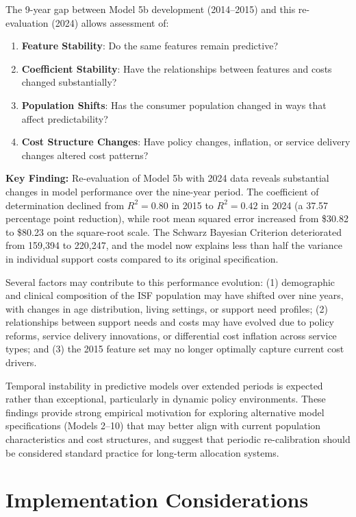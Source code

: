 The 9-year gap between Model 5b development (2014--2015) and this re-evaluation (2024) allows assessment of:

\begin{enumerate}
    \item \textbf{Feature Stability}: Do the same features remain predictive?
    \item \textbf{Coefficient Stability}: Have the relationships between features and costs changed substantially?
    \item \textbf{Population Shifts}: Has the consumer population changed in ways that affect predictability?
    \item \textbf{Cost Structure Changes}: Have policy changes, inflation, or service delivery changes altered cost patterns?
\end{enumerate}

\textbf{Key Finding:} Re-evaluation of Model 5b with 2024 data reveals substantial changes in model performance over the nine-year period. The coefficient of determination declined from $R^2 = 0.80$ in 2015 to $R^2 = 0.42$ in 2024 (a 37.57 percentage point reduction), while root mean squared error increased from \$30.82 to \$80.23 on the square-root scale. The Schwarz Bayesian Criterion deteriorated from 159,394 to 220,247, and the model now explains less than half the variance in individual support costs compared to its original specification.

Several factors may contribute to this performance evolution: (1) demographic and clinical composition of the ISF population may have shifted over nine years, with changes in age distribution, living settings, or support need profiles; (2) relationships between support needs and costs may have evolved due to policy reforms, service delivery innovations, or differential cost inflation across service types; and (3) the 2015 feature set may no longer optimally capture current cost drivers.

Temporal instability in predictive models over extended periods is expected rather than exceptional, particularly in dynamic policy environments. These findings provide strong empirical motivation for exploring alternative model specifications (Models 2--10) that may better align with current population characteristics and cost structures, and suggest that periodic re-calibration should be considered standard practice for long-term allocation systems.

\section{Implementation Considerations}

